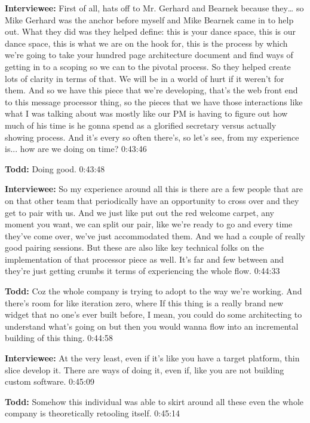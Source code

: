 \textbf{Interviewee:}  	First of all, hats off to Mr. Gerhard and Bearnek because they… so Mike Gerhard was the anchor before myself and Mike Bearnek came in to help out.  What they did was they helped define: this is your dance space, this is our dance space, this is what we are on the hook for, this is the process by which we're going to take your hundred page architecture document and find ways of getting in to a scoping so we can to the pivotal process.  So they helped create lots of clarity in terms of that. We will be in a world of hurt if it weren't for them.  And so we have this piece that we're developing, that's the web front end to this message processor thing, so the pieces that we have those interactions like what I was talking about was mostly like our PM is having to figure out how much of his time is he gonna spend as a glorified secretary  versus actually showing process. And it's every so often there's, so let's see, from my experience is... how are we doing on time?  0:43:46

\textbf{Todd:}  	Doing good.  0:43:48

\textbf{Interviewee:}  	So my experience around all this is there are a few people that are on that other team that periodically have an opportunity to cross over and they get to pair with us. And we just like put out the red welcome carpet, any moment you want, we can split our pair, like we're ready to go and every time they've come over, we've just accommodated them.   And we had a couple of really good pairing sessions.  But these are also like key technical folks on the implementation of that processor piece as well.  It's far and few between and they're just getting crumbs it terms of experiencing the whole flow.  0:44:33

\textbf{Todd:}  	Coz the whole company is trying to adopt to the way we're working.   And there's room for like iteration zero, where   If this thing is a really brand new widget that no one's ever built before, I mean, you could do some architecting to understand what's going on but then you would wanna flow into an incremental building of this thing.  0:44:58

\textbf{Interviewee:}  	At the very least, even if it's like you have a target platform, thin slice develop it.  There are ways of doing it, even if, like you are not building custom software.  0:45:09

\textbf{Todd:}  	Somehow this individual was able to skirt around all these even the whole company is theoretically retooling itself. 0:45:14

